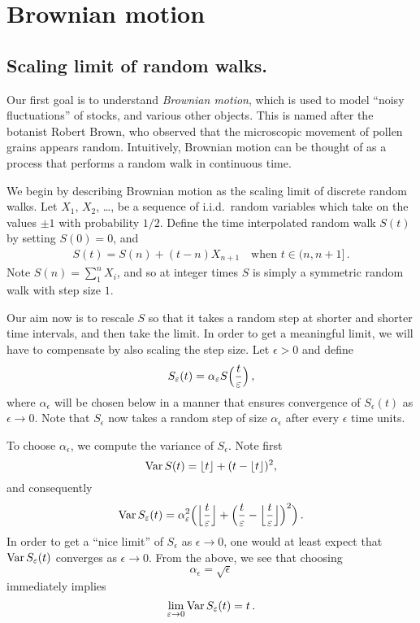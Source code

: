 
\ifstandalonechapter\setcounter{chapter}{1}\fi
\chapter{Brownian motion}
\section{Scaling limit of random walks.}
Our first goal is to understand \emph{Brownian motion}, which is used to model ``noisy fluctuations'' of stocks, and various other objects.
This is named after the botanist Robert Brown, who observed that the microscopic movement of pollen grains appears random.
Intuitively, Brownian motion can be thought of as a process that performs a random walk in continuous time.

We begin by describing Brownian motion as the scaling limit of discrete random walks.
Let $X_1$, $X_2$, \dots, be a sequence of i.i.d.\ random variables which take on the values $\pm 1$ with probability $1/2$.
Define the time interpolated random walk $S(t)$ by setting $S(0) = 0$, and
\begin{gather}
  S(t) = S(n) + (t - n) X_{n+1}
  \quad\text{when } t \in (n, n+1]\,.
\end{gather}
Note $S(n) = \sum_{1}^n X_i$, and so at integer times $S$ is simply a symmetric random walk with step size $1$.

Our aim now is to rescale $S$ so that it takes a random step at shorter and shorter time intervals, and then take the limit.
In order to get a meaningful limit, we will have to compensate by also scaling the step size.
Let $\epsilon > 0$ and define
\begin{equation*}
  S_\epsilon(t) = \alpha_\epsilon S\paren[\Big]{ \frac{t}{\epsilon} }\,,
\end{equation*}
where $\alpha_\epsilon$ will be chosen below in a manner that ensures convergence of $S_\epsilon(t)$ as $\epsilon \to 0$.
Note that $S_\epsilon$ now takes a random step of size $\alpha_\epsilon$ after every $\epsilon$ time units.

To choose $\alpha_\epsilon$, we compute the variance of $S_\epsilon$.
Note first
\begin{equation*}
  \var S(t) = \floor{t} + (t - \floor{t})^2,
\end{equation*}
and consequently
\begin{equation*}
  \var S_\epsilon(t)
    = \alpha_\epsilon^2 \paren[\Big]{
	\floor[\Big]{\frac{t}{\epsilon}}
	+ \paren[\Big]{\frac{t}{\epsilon} - \floor[\Big]{\frac{t}{\epsilon}}}^2
    }\,.
\end{equation*}
In order to get a ``nice limit'' of $S_\epsilon$ as $\epsilon \to 0$, one would at least expect that $\var S_\epsilon(t)$ converges as $\epsilon \to 0$.
From the above, we see that choosing
\begin{equation*}
  \alpha_\epsilon = \sqrt{\epsilon}
\end{equation*}
immediately implies
\begin{equation*}
  \lim_{\epsilon \to 0} \var S_\epsilon(t) = t\,.
\end{equation*}

